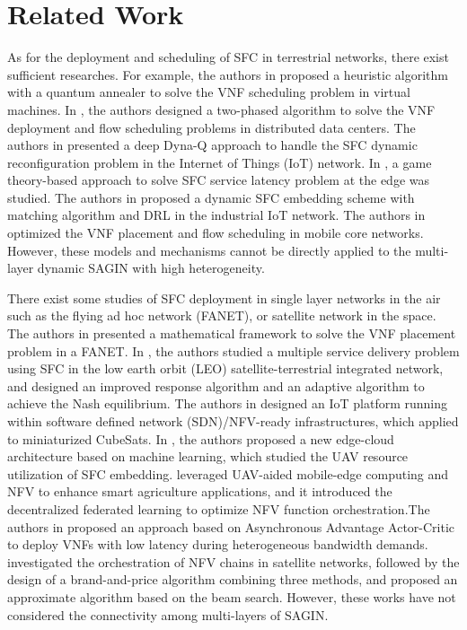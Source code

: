 \section{Related Work\label{sec:Related-Work}
}
As for the deployment and scheduling of SFC in terrestrial networks, there exist sufficient researches. For example, the authors in \cite{9637726} proposed a heuristic algorithm with a quantum annealer to solve the VNF scheduling problem in virtual machines. In \cite{9099505}, the authors designed a two-phased algorithm to solve the VNF deployment and flow scheduling problems in distributed data centers. The authors in \cite{9084136} presented a deep Dyna-Q approach to handle the SFC dynamic reconfiguration problem in the Internet of Things (IoT) network. In \cite{9785397}, a game theory-based approach to solve SFC service latency problem at the edge was studied. The authors in \cite{9632419} proposed a dynamic SFC embedding scheme with matching algorithm and DRL in the industrial IoT network. The authors in \cite{9122544} optimized the VNF placement and flow scheduling in mobile core networks. However, these models and mechanisms cannot be directly applied to the multi-layer dynamic SAGIN with high heterogeneity.

There exist some studies of SFC deployment in single layer networks in the air such as the flying ad hoc network (FANET), or satellite network in the space. The authors in \cite{9839646} presented a mathematical framework to solve the VNF placement problem in a FANET. In \cite{10032237}, the authors studied a multiple service delivery problem using SFC in the low earth orbit (LEO) satellite-terrestrial integrated network, and designed an improved response algorithm and an adaptive algorithm to achieve the Nash equilibrium. The authors in \cite{9013347} designed an IoT platform running within software defined network (SDN)/NFV-ready infrastructures, which applied to miniaturized CubeSats. In \cite{9652156}, the authors proposed a new edge-cloud architecture based on machine learning, which studied the UAV resource utilization of SFC embedding. \cite{10238738} leveraged UAV-aided mobile-edge computing and NFV to enhance smart agriculture applications, and it introduced  the decentralized federated learning to optimize NFV function orchestration.The authors in \cite{JIA2024104} proposed an approach based on Asynchronous Advantage Actor-Critic to deploy VNFs with low latency during heterogeneous bandwidth demands. \cite{jia2021vnf} investigated the orchestration of NFV chains in satellite networks, followed by the design of a brand-and-price algorithm combining three methods, and proposed an approximate algorithm based on the beam search. However, these works have not considered the connectivity among multi-layers of SAGIN.

